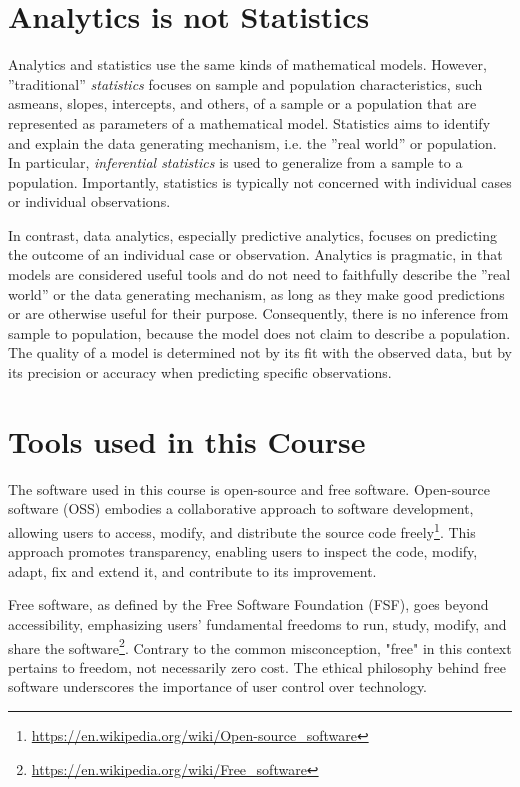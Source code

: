 \section{Analytics is not Statistics}

Analytics and statistics use the same kinds of mathematical models. However, ''traditional'' \emph{statistics} focuses on sample and population characteristics, such asmeans, slopes, intercepts, and others, of a sample or a population that are represented as parameters of a mathematical model. Statistics aims to identify and explain the data generating mechanism, i.e. the ''real world'' or population. In particular, \emph{inferential statistics} is used to generalize from a sample to a population. Importantly, statistics is typically not concerned with individual cases or individual observations.

In contrast, data analytics, especially predictive analytics, focuses on predicting the outcome of an individual case or observation. Analytics is pragmatic, in that models are considered useful tools and do not need to faithfully describe the ''real world'' or the data generating mechanism, as long as they make good predictions or are otherwise useful for their purpose. Consequently, there is no inference from sample to population, because the model does not claim to describe a population. The quality of a model is determined not by its fit with the observed data, but by its precision or accuracy when predicting specific observations. 

\section{Tools used in this Course}

The software used in this course is open-source and free software. Open-source software (OSS) embodies a collaborative approach to software development, allowing users to access, modify, and distribute the source code freely\footnote{\url{https://en.wikipedia.org/wiki/Open-source_software}}. This approach promotes transparency, enabling users to inspect the code, modify, adapt, fix and extend it, and contribute to its improvement. 

Free software, as defined by the Free Software Foundation (FSF), goes beyond accessibility, emphasizing users' fundamental freedoms to run, study, modify, and share the software\footnote{\url{https://en.wikipedia.org/wiki/Free_software}}. Contrary to the common misconception, "free" in this context pertains to freedom, not necessarily zero cost. The ethical philosophy behind free software underscores the importance of user control over technology. 


